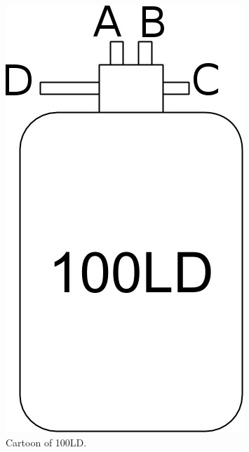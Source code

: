 \begin{figure}[h]
\begin{minipage}{.35\textwidth}
 \includegraphics[width=\textwidth]{./img/100LD-cartoon.jpg}
 \caption{Cartoon of 100LD.}
 \label{fig:100LD-cartoon}
 \end{minipage}
 \quad
\end{figure}


